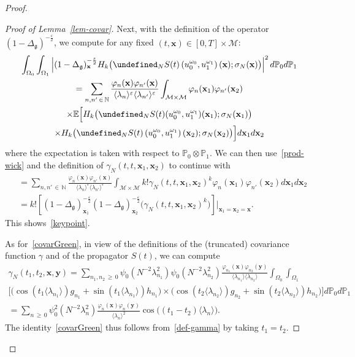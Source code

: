 \documentclass[AHL,Unicode,longabstracts,published]{cedram}
\newcommand{\E}{\mathbb{E}}
\newcommand{\Prob}{\mathbb{P}}
\newcommand{\N}{\mathbb{N}}
\let\P= \undefined
\newcommand{\P}{\mathbf{P}}
\newcommand{\x}{\mathbf{x}}
\newcommand{\y}{\mathbf{y}}
\newcommand{\M}{\mathcal{M}}
\newcommand{\g}{\mathfrak{g}}
\newcommand{\Dlg}{\Delta_{\g}}
\newcommand{\eps}{\varepsilon}
\newcommand{\s}{\sigma}
\renewcommand{\o}{\omega}
\renewcommand{\O}{\Omega}
\newcommand{\jb}[1] {\langle #1 \rangle}
\begin{document}
\begin{proof}
\begin{proof}[Proof of Lemma~\ref{lem-covar}]
Next, with the definition of the operator $(1-\Dlg)^{-\frac\eps2}$, we compute for any fixed $(t,\x)\in [0,T]\times\M$:
\begin{multline*}
\int_{\O_0}\int_{\O_1}\left|(1-\Dlg)_\x^{-\frac\eps2}H_k\big(\P_NS(t)\left(u_0^{\o_0},u_1^{\o_1}\right)(\x);\s_N(\x)\big)\right|^2d\Prob_0d\Prob_1\\
= \sum_{n,n'\,\in\,\N}\frac{\varphi_n(\x)\varphi_{n'}(\x)}{\jb{\lambda_n}^{\eps}\jb{\lambda_{n'}}^{\eps}}\int_{\M\times\M}\varphi_n(\x_1)\varphi_{n'}(\x_2)\\
\times\E\Big[H_k\big(\P_NS(t)(u_0^{\o_0},u_1^{\o_1})(\x_1);\s_N(\x_1)\big)\\
\times H_k\big(\P_NS(t)\left(u_0^{\o_0},u_1^{\o_1}\right)(\x_2);\s_N(\x_2)\big)\Big]d\x_1d\x_2
\end{multline*}
where the expectation is taken with respect to $\Prob_0\otimes\Prob_1$. We can then use~\eqref{prod-wick} and the definition of $\gamma_N(t,t,\x_1,\x_2)$ to continue with
\begin{align*}
&= \sum_{n,n'\,\in\,\N}\frac{\varphi_n(\x)\varphi_{n'}(\x)}{\jb{\lambda_n}^{\eps}\jb{\lambda_{n'}}^{\eps}}\int_{\M\times\M}k! \gamma_N(t,t,\x_1,\x_2)^k\varphi_n(\x_1)\varphi_{n'}(\x_2)d\x_1 d\x_2\\
&=k!\left[(1-\Dlg)_{\x_1}^{-\frac\eps2}(1-\Dlg)_{\x_2}^{-\frac\eps2}\big(\gamma_N(t,t,\x_1,\x_2)^k\big)\right]\Big|_{\x_1=\x_2=\x}.
\end{align*}
This shows~\eqref{keypoint}.

As for~\eqref{covarGreen}, in view of the definitions of the (truncated) covariance function $\gamma$ and of the propagator $S(t)$, we can compute
\begin{multline}\label{def-gamma}
\gamma_N\left(t_1,t_2,\x,\y\right)
=\sum_{n_1,n_2\,\ge\,0}\psi_0\left(N^{-2}\lambda_{n_1}^2\right)\psi_0\left(N^{-2}\lambda_{n_2}^2\right)\frac{\varphi_{n_1}(\x)\varphi_{n_2}(\y)}{\jb{\lambda_{n_1}}\jb{\lambda_{n_2}}} \int_{\O_0}\int_{\O_1}\\\Big[\big(\cos(t_1\jb{\lambda_{n_1}})g_{n_1}+\sin(t_1\jb{\lambda_{n_1}})h_{n_1}\big)
\times\big(\cos(t_2\jb{\lambda_{n_2}})g_{n_2}+\sin\left(t_2\jb{\lambda_{n_2}}\right)h_{n_2}\big)\Big]d\Prob_0d\Prob_1\\
=\sum_{n\,\ge\,0}\psi_0^2(N^{-2}\lambda_{n}^2)\frac{\varphi_{n}(\x)\varphi_{n}(\y)}{\jb{\lambda_{n}}^2}\cos\big((t_1-t_2)\jb{\lambda_{n}}\big).
\end{multline}
The identity~\eqref{covarGreen} thus follows from~\eqref{def-gamma} by taking $t_1=t_2$.
\end{proof}


\end{proof}
\end{document}
